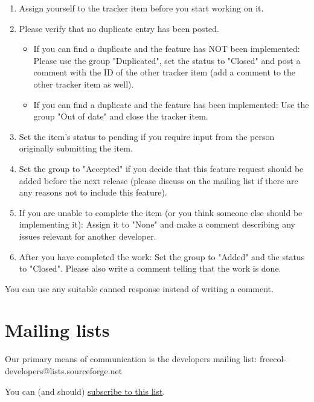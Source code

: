 \documentclass[12pt]{book}
\begin{document}
\begin{enumerate}
\item Assign yourself to the tracker item before you start working on it.

\item Please verify that no duplicate entry has been posted.

\begin{itemize}
\item If you can find a duplicate and the feature has NOT been
  implemented: Please use the group "Duplicated", set the status to
  "Closed" and post a comment with the ID of the other tracker item
  (add a comment to the other tracker item as well).

\item If you can find a duplicate and the feature has been
  implemented: Use the group "Out of date" and close the tracker item.
\end{itemize}

\item Set the item's status to pending if you require input from the person
   originally submitting the item.

\item Set the group to "Accepted" if you decide that this feature
   request should be added before the next release (please discuss on
   the mailing list if there are any reasons not to include this
   feature).

\item If you are unable to complete the item (or you think someone else
   should be implementing it): Assign it to "None" and make a comment
   describing any issues relevant for another developer.

\item After you have completed the work: Set the group to "Added"
   and the status to "Closed". Please also write a comment telling that
   the work is done.
\end{enumerate}

You can use any suitable canned response instead of writing a comment.


\hypertarget{Mailing lists}{\section{Mailing lists}}

Our primary means of communication is the developers mailing list:
freecol-developers@lists.sourceforge.net

You can (and should)
\href{http://lists.sourceforge.net/lists/listinfo/freecol-developers}{subscribe to this list}.
\end{document}
